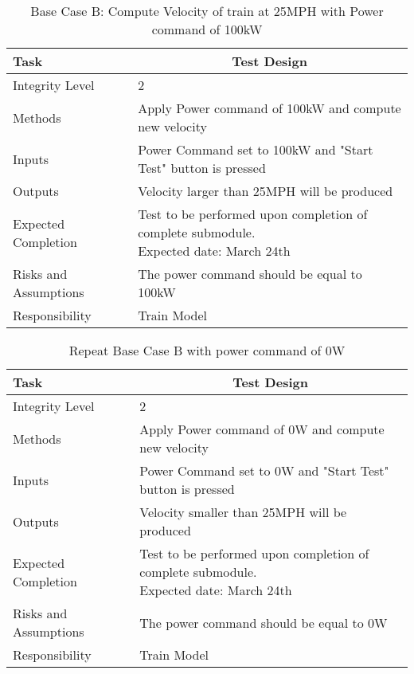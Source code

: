 \documentclass[]{article}
\begin{document}
	\begin{table}[H]
		\centering
		\caption{Base Case B: Compute Velocity of train at 25MPH with Power command of 100kW }
		\begin{tabular}{|l|l|}
			\hline
			Task & \multicolumn{1}{c|}{Test Design} \\ \hline
			Integrity Level & 2 \\ \hline
			Methods & Apply Power command of 100kW and compute new velocity  \\ \hline
			Inputs &  Power Command set to 100kW and "Start Test" button is pressed \\ \hline
			Outputs &  Velocity larger than 25MPH will be produced  \\ \hline
			Expected Completion & \parbox[t]{10cm}{Test to be performed upon completion of complete submodule.\\ Expected date: March 24th}\\ \hline
			Risks and Assumptions & The power command should be equal to 100kW \\ \hline
			Responsibility & Train Model\\ \hline
		\end{tabular}
	\end{table}

	\begin{table}[H]
		\centering
		\caption{Repeat Base Case B with power command of 0W }
		\begin{tabular}{|l|l|}
			\hline
			Task & \multicolumn{1}{c|}{Test Design} \\ \hline
			Integrity Level & 2 \\ \hline
			Methods & Apply Power command of 0W and compute new velocity  \\ \hline
			Inputs &  Power Command set to 0W and "Start Test" button is pressed \\ \hline
			Outputs &  Velocity smaller than 25MPH will be produced  \\ \hline
			Expected Completion & \parbox[t]{10cm}{Test to be performed upon completion of complete submodule.\\ Expected date: March 24th}\\ \hline
			Risks and Assumptions & The power command should be equal to 0W \\ \hline
			Responsibility & Train Model\\ \hline
		\end{tabular}
	\end{table}
\end{document}

